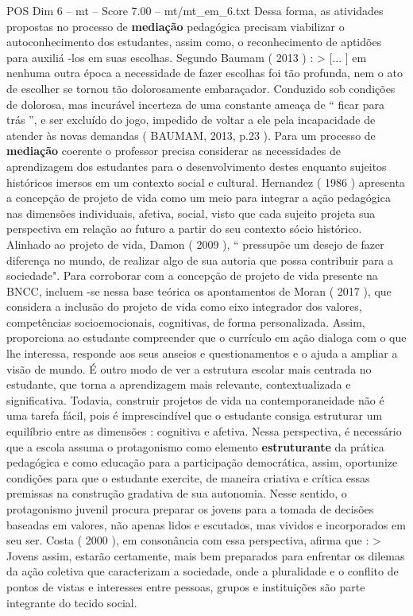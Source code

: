 \begin{textsample}{POS Dim 6 – mt – Score 7.00 – mt/mt\_em\_6.txt}
Dessa forma, as atividades propostas no processo de \textbf{mediação} pedagógica precisam viabilizar o autoconhecimento dos estudantes, assim como, o reconhecimento de aptidões para auxiliá -los em suas escolhas.
Segundo Baumam ( 2013 ) : > [... ] em nenhuma outra época a necessidade de fazer escolhas foi tão profunda, nem o ato de escolher se tornou tão dolorosamente embaraçador.
Conduzido sob condições de dolorosa, mas incurável incerteza de uma constante ameaça de “ ficar para trás ”, e ser excluído do jogo, impedido de voltar a ele pela incapacidade de atender às novas demandas ( BAUMAM, 2013, p.23 ).
Para um processo de \textbf{mediação} coerente o professor precisa considerar as necessidades de aprendizagem dos estudantes para o desenvolvimento destes enquanto sujeitos históricos imersos em um contexto social e cultural.
Hernandez ( 1986 ) apresenta a concepção de projeto de vida como um meio para integrar a ação pedagógica nas dimensões individuais, afetiva, social, visto que cada sujeito projeta sua perspectiva em relação ao futuro a partir do seu contexto sócio histórico.
Alinhado ao projeto de vida, Damon ( 2009 ), “ pressupõe um desejo de fazer diferença no mundo, de realizar algo de sua autoria que possa contribuir para a sociedade".
Para corroborar com a concepção de projeto de vida presente na BNCC, incluem -se nessa base teórica os apontamentos de Moran ( 2017 ), que considera a inclusão do projeto de vida como eixo integrador dos valores, competências socioemocionais, cognitivas, de forma personalizada.
Assim, proporciona ao estudante compreender que o currículo em ação dialoga com o que lhe interessa, responde aos seus anseios e questionamentos e o ajuda a ampliar a visão de mundo.
É outro modo de ver a estrutura escolar mais centrada no estudante, que torna a aprendizagem mais relevante, contextualizada e significativa.
Todavia, construir projetos de vida na contemporaneidade não é uma tarefa fácil, pois é imprescindível que o estudante consiga estruturar um equilíbrio entre as dimensões : cognitiva e afetiva.
Nessa perspectiva, é necessário que a escola assuma o protagonismo como elemento \textbf{estruturante} da prática pedagógica e como educação para a participação democrática, assim, oportunize condições para que o estudante exercite, de maneira criativa e crítica essas premissas na construção gradativa de sua autonomia.
Nesse sentido, o protagonismo juvenil procura preparar os jovens para a tomada de decisões baseadas em valores, não apenas lidos e escutados, mas vividos e incorporados em seu ser.
Costa ( 2000 ), em consonância com essa perspectiva, afirma que : > Jovens assim, estarão certamente, mais bem preparados para enfrentar os dilemas da ação coletiva que caracterizam a sociedade, onde a pluralidade e o conflito de pontos de vistas e interesses entre pessoas, grupos e instituições são parte integrante do tecido social.

\end{textsample}
